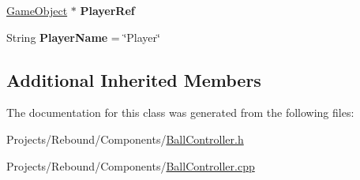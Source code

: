 \begin{DoxyCompactItemize}
\item 
\hypertarget{classDCEngine_1_1Components_1_1BallController_a662d826cd1dfa11d2a0dd572f916c33a}{\hyperlink{classDCEngine_1_1GameObject}{Game\-Object} $\ast$ {\bfseries Player\-Ref}}\label{classDCEngine_1_1Components_1_1BallController_a662d826cd1dfa11d2a0dd572f916c33a}

\item 
\hypertarget{classDCEngine_1_1Components_1_1BallController_a417851071955e3084b1cfe9af73f25b7}{String {\bfseries Player\-Name} = \char`\"{}Player\char`\"{}}\label{classDCEngine_1_1Components_1_1BallController_a417851071955e3084b1cfe9af73f25b7}

\end{DoxyCompactItemize}
\subsection*{Additional Inherited Members}


The documentation for this class was generated from the following files\-:\begin{DoxyCompactItemize}
\item 
Projects/\-Rebound/\-Components/\hyperlink{BallController_8h}{Ball\-Controller.\-h}\item 
Projects/\-Rebound/\-Components/\hyperlink{BallController_8cpp}{Ball\-Controller.\-cpp}\end{DoxyCompactItemize}
